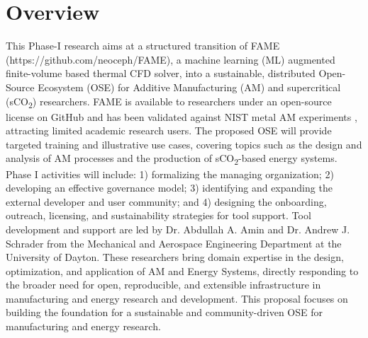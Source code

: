 \documentclass[11pt]{article}
\newcommand{\CO}[1]{CO\textsubscript{#1}}
\begin{document}
\section*{Overview}
\vspace{-3pt}
\noindent
This Phase-I research aims at a structured transition of FAME (https://github.com/neoceph/FAME), a machine learning (ML) augmented finite-volume based thermal CFD solver, into a sustainable, distributed Open-Source Ecosystem (OSE) for Additive Manufacturing (AM) and supercritical (s\CO{2})  researchers. FAME is available to researchers under an open-source license on GitHub and has been validated against NIST metal AM experiments \cite{aminPhysicsGuidedHeat2024}, attracting limited academic research users. The proposed OSE will provide targeted training and illustrative use cases, covering topics such as the design and analysis of AM processes and the production of s\CO{2}-based energy systems. Phase I activities will include: 1) formalizing the managing organization; 2) developing an effective governance model; 3) identifying and expanding the external developer and user community; and 4) designing the onboarding, outreach, licensing, and sustainability strategies for tool support. Tool development and support are led by Dr. Abdullah A. Amin and Dr. Andrew J. Schrader from the Mechanical and Aerospace Engineering Department at the University of Dayton. These researchers bring domain expertise in the design, optimization, and application of AM and Energy Systems, directly responding to the broader need for open, reproducible, and extensible infrastructure in manufacturing and energy research and development. This proposal focuses on building the foundation for a sustainable and community-driven OSE for manufacturing and energy research.
%
\vspace{-3pt}
\end{document}
